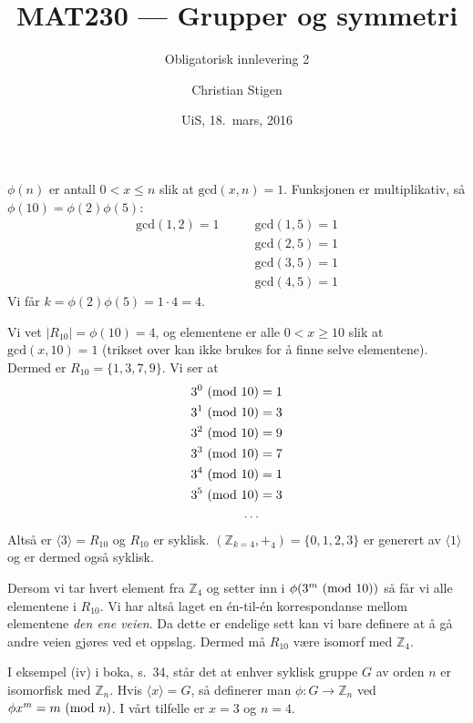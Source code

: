 \documentclass[a4paper,norsk,12pt]{article}
\title{MAT230 --- Grupper og symmetri}
\subtitle{Obligatorisk innlevering 2}
\author{Christian Stigen}
\date{UiS, 18.~mars, 2016}
\begin{document}
\maketitle


$\phi{(n)}$ er antall $0 < x \leqslant n$ slik at $\text{gcd}{(x,n)} = 1$.
Funksjonen er multiplikativ, så $\phi{(10)} = \phi{(2)}\phi{(5)}$:
\begin{align*}
  \text{gcd}(1, 2) = 1 & \qquad\text{gcd}(1, 5) = 1 \\
                       & \qquad\text{gcd}(2, 5) = 1 \\
                       & \qquad\text{gcd}(3, 5) = 1 \\
                       & \qquad\text{gcd}(4, 5) = 1
\end{align*}
Vi får $k = \phi{(2)}\phi{(5)} = 1\cdot4 =4 $.

Vi vet $|R_10| = \phi{(10)} = 4$, og elementene er alle $0<x\geqslant 10$ slik
at $\text{gcd}(x,10)=1$ (trikset over kan ikke brukes for å finne selve
elementene). Dermed er $R_{10} = \{ 1,3,7,9 \}$. Vi ser at
\begin{align*}
  3^0 \ (\text{mod}\ 10) &= 1 \\
  3^1 \ (\text{mod}\ 10) &= 3 \\
  3^2 \ (\text{mod}\ 10) &= 9 \\
  3^3 \ (\text{mod}\ 10) &= 7 \\
  3^4 \ (\text{mod}\ 10) &= 1 \\
  3^5 \ (\text{mod}\ 10) &= 3 \\
  \ldots
\end{align*}
Altså er $\langle 3 \rangle = R_{10}$ og $R_{10}$ er syklisk. 
$(\mathbb{Z}_{k=4}, +_4) = \{0,1,2,3\}$ er generert av $\langle 1 \rangle$ og
er dermed også syklisk.

Dersom vi tar hvert element fra $\mathbb{Z}_4$ og setter inn i
$\phi{(3^m\ (\text{mod}\ 10))}$ så får vi alle elementene i $R_{10}$. Vi har altså laget
en én-til-én korrespondanse mellom elementene \textit{den ene veien}. Da dette
er endelige sett kan vi bare definere at å gå andre veien gjøres ved et
oppslag. Dermed må $R_{10}$ være isomorf med $\mathbb{Z}_4$.

I eksempel (iv) i boka, s.~34, står det at enhver syklisk gruppe $G$ av orden
$n$ er isomorfisk med $\mathbb{Z}_n$. Hvis $\langle x \rangle = G$, så
definerer man $\phi\colon G \rightarrow \mathbb{Z}_n$ ved $\phi{x^m} = m
\ (\text{mod}\ n)$. I vårt tilfelle er $x=3$ og $n=4$.
\end{document}
